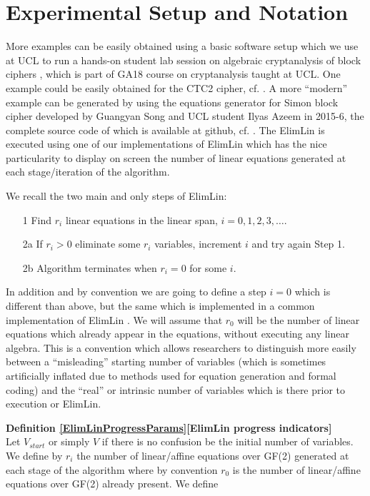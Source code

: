 \section{Experimental Setup and Notation}
\label{ElimLinSetup}
\label{ElimLinNotation}

More examples can be easily obtained using a basic software setup which we use at UCL to run
a hands-on student lab session on algebraic cryptanalysis of block ciphers \cite{AlgteachElimLinLab},
which is part of GA18 course on cryptanalysis taught at UCL.
One example could be easily obtained for the CTC2 cipher, cf. \cite{FastAlg,FastAlg2,AlgteachElimLinLab}.
A more ``modern'' example can be generated by using the equations generator for Simon block cipher
developed by Guangyan Song and UCL student Ilyas Azeem in 2015-6,
the complete source code of which is
available at github, cf. \cite{AlgteachElimLinLab,CourtoisSoftware}.
The ElimLin is executed using one of our implementations of
ElimLin \cite{AlgteachElimLinLab,CourtoisSoftware} which has the nice particularity to display on screen the number of linear equations generated at each stage/iteration of the algorithm.

We recall the two main and only steps of ElimLin:

\begin{enumerate}
	\item[1] Find $r_i$ linear equations in the linear span, $i=0,1,2,3,\ldots$.
	\item[2a] If $r_i>0$ eliminate some $r_i$ variables,
	increment $i$ and try again Step 1.
	\item[2b] Algorithm terminates when $r_i=0$ for some $i$.
\end{enumerate}

In addition and by convention we are going to define a step $i=0$ which is different than
above, but the same which is implemented in a common implementation of ElimLin \cite{CourtoisSoftware}.
We will assume that $r_0$ will be the number of linear equations which already appear in the equations,
without executing any linear algebra. This is a convention which allows researchers to distinguish
more easily between a ``misleading'' starting number of variables (which is sometimes artificially inflated due to
methods used for equation generation and formal coding)
and the ``real'' or intrinsic number of variables which is there prior to execution or ElimLin.

{\bf Definition \ref{ElimLinProgressParams}[ElimLin progress indicators]}\\
\label{ElimLinProgressParams}
Let $V_{start}$ or simply $V$ if there is no confusion
be the initial number of variables.
We define by $r_i$ the number of
linear/affine equations over GF(2)
generated at each stage of the algorithm
where by convention $r_0$ is the number of
linear/affine equations over GF(2) already present.
We define

